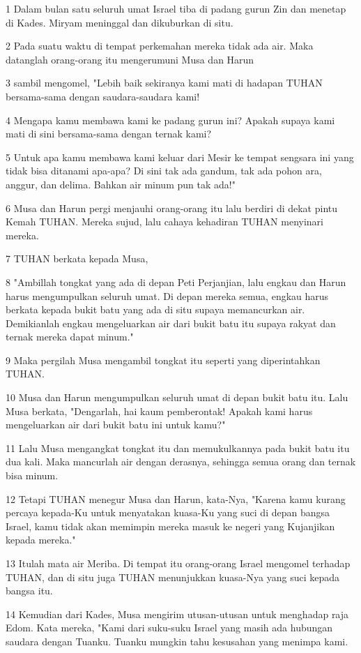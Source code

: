 \par 1 Dalam bulan satu seluruh umat Israel tiba di padang gurun Zin dan menetap di Kades. Miryam meninggal dan dikuburkan di situ.
\par 2 Pada suatu waktu di tempat perkemahan mereka tidak ada air. Maka datanglah orang-orang itu mengerumuni Musa dan Harun
\par 3 sambil mengomel, "Lebih baik sekiranya kami mati di hadapan TUHAN bersama-sama dengan saudara-saudara kami!
\par 4 Mengapa kamu membawa kami ke padang gurun ini? Apakah supaya kami mati di sini bersama-sama dengan ternak kami?
\par 5 Untuk apa kamu membawa kami keluar dari Mesir ke tempat sengsara ini yang tidak bisa ditanami apa-apa? Di sini tak ada gandum, tak ada pohon ara, anggur, dan delima. Bahkan air minum pun tak ada!"
\par 6 Musa dan Harun pergi menjauhi orang-orang itu lalu berdiri di dekat pintu Kemah TUHAN. Mereka sujud, lalu cahaya kehadiran TUHAN menyinari mereka.
\par 7 TUHAN berkata kepada Musa,
\par 8 "Ambillah tongkat yang ada di depan Peti Perjanjian, lalu engkau dan Harun harus mengumpulkan seluruh umat. Di depan mereka semua, engkau harus berkata kepada bukit batu yang ada di situ supaya memancurkan air. Demikianlah engkau mengeluarkan air dari bukit batu itu supaya rakyat dan ternak mereka dapat minum."
\par 9 Maka pergilah Musa mengambil tongkat itu seperti yang diperintahkan TUHAN.
\par 10 Musa dan Harun mengumpulkan seluruh umat di depan bukit batu itu. Lalu Musa berkata, "Dengarlah, hai kaum pemberontak! Apakah kami harus mengeluarkan air dari bukit batu ini untuk kamu?"
\par 11 Lalu Musa mengangkat tongkat itu dan memukulkannya pada bukit batu itu dua kali. Maka mancurlah air dengan derasnya, sehingga semua orang dan ternak bisa minum.
\par 12 Tetapi TUHAN menegur Musa dan Harun, kata-Nya, "Karena kamu kurang percaya kepada-Ku untuk menyatakan kuasa-Ku yang suci di depan bangsa Israel, kamu tidak akan memimpin mereka masuk ke negeri yang Kujanjikan kepada mereka."
\par 13 Itulah mata air Meriba. Di tempat itu orang-orang Israel mengomel terhadap TUHAN, dan di situ juga TUHAN menunjukkan kuasa-Nya yang suci kepada bangsa itu.
\par 14 Kemudian dari Kades, Musa mengirim utusan-utusan untuk menghadap raja Edom. Kata mereka, "Kami dari suku-suku Israel yang masih ada hubungan saudara dengan Tuanku. Tuanku mungkin tahu kesusahan yang menimpa kami.
